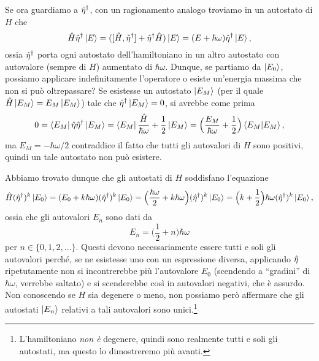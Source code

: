 Se ora guardiamo a ${\hat{\eta}}^\dagger$, con un ragionamento analogo troviamo in un autostato di $H$ che
\begin{equation}
	\hat{H}{\hat{\eta}}^\dagger\left|{E}\right\rangle=([\hat{H},{\hat{\eta}}^\dagger]+{\hat{\eta}}^\dagger\hat{H})\left|{E}\right\rangle=(E+\hbar\omega){\hat{\eta}}^\dagger\left|{E}\right\rangle,
\end{equation}
ossia ${\hat{\eta}}^\dagger$ porta ogni autostato dell'hamiltoniano in un altro autostato con autovalore (sempre di $H$) aumentato di $\hbar\omega$.
Dunque, se partiamo da $\left|{E_0}\right\rangle$, possiamo applicare indefinitamente l'operatore o esiste un'energia massima che non si può oltrepassare?
Se esistesse un autostato $\left|{E_M}\right\rangle$ (per il quale $\hat{H}\left|{E_M}\right\rangle=E_M\left|{E_M}\right\rangle$) tale che ${\hat{\eta}}^\dagger\left|{E_M}\right\rangle=0$, si avrebbe come prima
\begin{equation}
	0=\left\langle{E_M}\right|\hat{\eta}{\hat{\eta}}^\dagger\left|{E_M}\right\rangle=\left\langle{E_M}\right|\frac{\hat{H}}{\hbar\omega}+\frac12\left|{E_M}\right\rangle=\Big(\frac{E_M}{\hbar\omega}+\frac12\Big)\left\langle{E_M}\middle|{E_M}\right\rangle,
\end{equation}
ma $E_M=-\hbar\omega/2$ contraddice il fatto che tutti gli autovalori di $H$ sono positivi, quindi un tale autostato non può esistere.

Abbiamo trovato dunque che gli autostati di $H$ soddisfano l'equazione
\begin{equation}
	\hat{H}({\hat{\eta}}^\dagger)^k\left|{E_0}\right\rangle=(E_0+k\hbar\omega)({\hat{\eta}}^\dagger)^k\left|{E_0}\right\rangle=\Big(\frac{\hbar\omega}2+k\hbar\omega\Big)({\hat{\eta}}^\dagger)^k\left|{E_0}\right\rangle=\Big(k+\frac12\Big)\hbar\omega({\hat{\eta}}^\dagger)^k\left|{E_0}\right\rangle,
\end{equation}
ossia che gli autovalori $E_n$ sono dati da
\begin{equation}
	E_n=\Big(\frac12+n\Big)\hbar\omega
	\label{eq:oscillatore-armonico-autovalori-hamiltoniano}
\end{equation}
per $n\in\{0,1,2,\dots\}$.
Questi devono necessariamente essere tutti e soli gli autovalori perch\'e, se ne esistesse uno con un espressione diversa, applicando $\hat{\eta}$ ripetutamente non si incontrerebbe più l'autovalore $E_0$ (scendendo a ``gradini'' di $\hbar\omega$, verrebbe saltato) e si scenderebbe cos\`i in autovalori negativi, che è assurdo.
Non conoscendo se $H$ sia degenere o meno, non possiamo però affermare che gli autostati $\left|{E_n}\right\rangle$ relativi a tali autovalori sono unici.\footnote{L'hamiltoniano \emph{non è} degenere, quindi sono realmente tutti e soli gli autostati, ma questo lo dimostreremo più avanti.}

